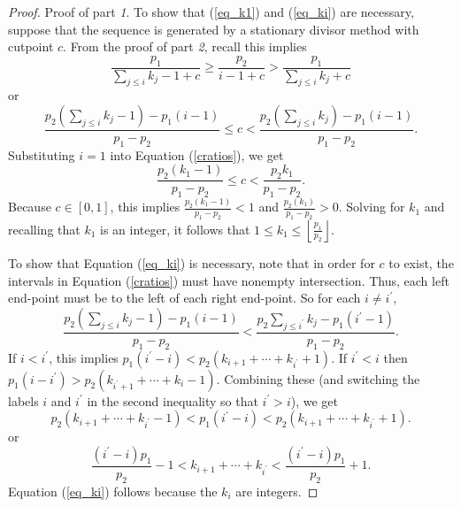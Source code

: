 \documentclass[pdflatex,sn-mathphys-num]{sn-jnl}
\theoremstyle{thmstyleone}%
\theoremstyle{thmstyletwo}%
\theoremstyle{thmstylethree}%
\begin{document}
\begin{proof} Proof of part {\it 1}. 
To  show that (\ref{eq_k1}) and (\ref{eq_ki}) are necessary,  suppose that the sequence is generated by a stationary divisor method with cutpoint $c$. From the proof of part {\it 2},  recall this implies
\begin{equation*} \tag{5}
\frac{p_1}{\sum_{j \le i}k_j -1+c} \ge \frac{p_2}{i-1+c}  > \frac{p_1}{\sum_{j \le i}k_j +c}
\end{equation*}
or
\begin{equation*}\tag{6}
\frac{p_2(\sum_{j \le i}k_j -1)-p_1(i-1)}{p_1-p_2} \le c < \frac{p_2(\sum_{j \le i}k_j) -p_1(i-1)}{p_1-p_2}.
\end{equation*}
Substituting $i=1$ into Equation (\ref{cratios}), we get
\begin{equation*}
\frac{p_2(k_1-1)}{p_1-p_2} \le c < \frac{p_2k_1}{p_1-p_2}.
\end{equation*}
Because $c \in [0,1]$, this implies  $\frac{p_2(k_1-1)}{p_1-p_2}<1$ and $\frac{p_2(k_1)}{p_1-p_2}>0$. Solving for $k_1$ and recalling that $k_1$ is an integer, it follows that  $1 \le k_1 \le \left\lfloor \frac{p_1}{p_2} \right\rfloor$.

To show that  Equation (\ref{eq_ki}) is necessary, note that in order for $c$ to exist, the intervals in Equation (\ref{cratios}) must have nonempty intersection. Thus, each left end-point must be to the left of each right end-point. So for each $i \ne i^\prime,$
$$\frac{p_2(\sum_{j \le i}k_j -1)-p_1(i-1)}{p_1-p_2} < \frac{p_2\sum_{j \le i^\prime}k_j -p_1(i^\prime-1)}{p_1-p_2}.$$
If $i < i^\prime$, this implies $p_1(i^\prime-i) < p_2(k_{i+1} + \cdots + k_{i^\prime}+1)$.  If $i^\prime < i$ then  $p_1(i-i^\prime) > p_2(k_{i^\prime+1} + \cdots + k_{i}-1)$. Combining these (and switching the labels $i$ and $i^{\prime}$ in the second inequality so that $i^\prime > i$), we get
$$p_2(k_{i+1}+ \cdots + k_{i^\prime}-1) <p_1(i^\prime-i) < p_2(k_{i+1}+ \cdots + k_{i^\prime}+1).$$
 or 
$$\frac{(i^\prime-i)p_1}{p_2}-1 < k_{i+1}+ \cdots + k_{i^\prime} < \frac{(i^\prime-i)p_1}{p_2}+1.$$
Equation (\ref{eq_ki}) follows because the $k_i$ are integers.


\end{proof}
\end{document}
